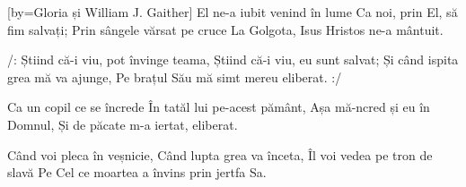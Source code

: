 [by={Gloria și William J. Gaither}]
\beginverse
El ne-a iubit venind în lume
Ca noi, prin El, să fim salvați;
Prin sângele vărsat pe cruce
La Golgota, Isus Hristos ne-a mântuit.
\endverse

\beginchorus
/: Știind că-i viu, pot învinge teama,
Știind că-i viu, eu sunt salvat;
Și când ispita grea mă va ajunge,
Pe brațul Său mă simt mereu eliberat. :/
\endchorus

\beginverse
Ca un copil ce se încrede
În tatăl lui pe-acest pământ,
Așa mă-ncred și eu în Domnul,
Și de păcate m-a iertat, eliberat.
\endverse

\beginverse
Când voi pleca în veșnicie,
Când lupta grea va înceta,
Îl voi vedea pe tron de slavă
Pe Cel ce moartea a învins prin jertfa Sa.
\endverse
\endsong